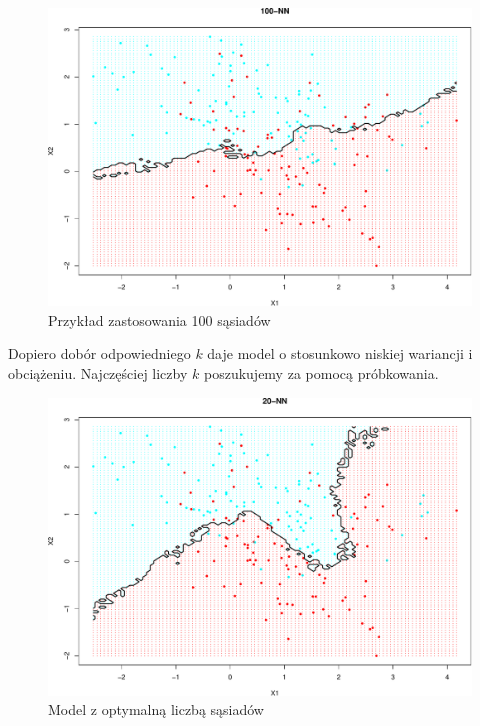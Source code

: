 \documentclass[]{book}
\theoremstyle{plain}
\theoremstyle{definition}
\theoremstyle{definition}
\theoremstyle{definition}
\theoremstyle{definition}
\theoremstyle{remark}
\begin{document}
\begin{figure}

{\centering \includegraphics{EksploracjaDanych_files/figure-latex/knn2-1} 

}

\caption{Przykład zastosowania 100 sąsiadów}\label{fig:knn2}
\end{figure}

Dopiero dobór odpowiedniego \(k\) daje model o stosunkowo niskiej wariancji i obciążeniu. Najczęściej liczby \(k\) poszukujemy za pomocą próbkowania.

\begin{figure}

{\centering \includegraphics{EksploracjaDanych_files/figure-latex/knn3-1} 

}

\caption{Model z optymalną liczbą sąsiadów}\label{fig:knn3}
\end{figure}
\end{document}
